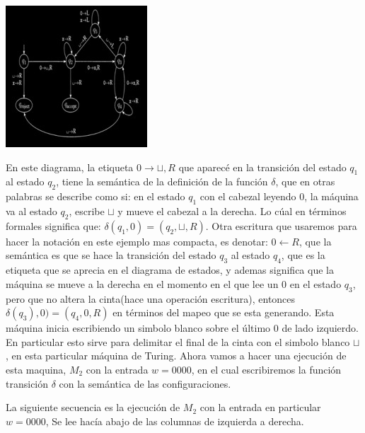 \documentclass[10pt]{report}
\begin{document}
    \begin{center}
        \includegraphics{Im_1.jpg}
    \end{center}
    \newline
    En este diagrama, la etiqueta $0\rightarrow \sqcup,R$ que aparecé en la transición del estado $q_{1}$ al estado $q_{2}$,
    tiene la semántica de la definición de la función $\delta$, que en otras palabras se describe como si:\newline
    en el estado $q_{1}$ con el cabezal leyendo $0$, la máquina va al estado $q_{2}$, escribe $\sqcup$ y mueve el cabezal
    a la derecha.\newline
    Lo cúal en términos formales significa que: $\delta(q_{1},0) = (q_{2},\sqcup, R)$.
    Otra escritura que usaremos para hacer la notación en este ejemplo mas compacta,
    es denotar: $0\leftarrow R$, que la semántica es que se hace la transición del estado $q_{3}$ al estado $q_{4}$, que
    es la etiqueta que se aprecia en el diagrama de estados, y ademas significa que la máquina se mueve a la derecha en
    el momento en el que lee un $0$ en el estado $q_{3}$, pero que no altera la cinta(\no hace una operación escritura),
    entonces $\delta(q_{3}),0) = (q_{4},0,R)$ en términos del mapeo que se esta generando.\newline
    Esta máquina inicia escribiendo un simbolo blanco sobre el último $0$ de lado izquierdo. En particular esto sirve
    para delimitar el final de la cinta con el simbolo blanco $\sqcup$, en esta particular máquina de Turing.
    \newline
    Ahora vamos a hacer una ejecución de esta maquina, $M_{2}$ con la entrada $w = 0000$, en el cual escribiremos la función
    transición $\delta$ con la semántica de las configuraciones.

    La siguiente secuencia es la ejecución de $M_{2}$ con la entrada en particular $w = 0000$,
    Se lee hacía abajo de las columnas de izquierda a derecha.
\end{document}
